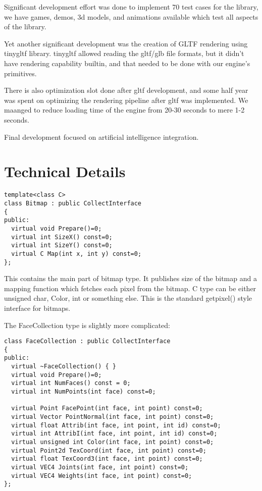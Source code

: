 \documentclass[11pt,twoside,a4paper]{article}
\begin{document}
Significant development effort was done to implement 70 test cases for
the library, we have games, demos, 3d models, and animations available
which test all aspects of the library.

Yet another significant development was the creation of GLTF rendering
using tinygltf library. tinygltf allowed reading the gltf/glb file
formats, but it didn't have rendering capability builtin, and that
needed to be done with our engine's primitives.

There is also optimization slot done after gltf development, and some
half year was spent on optimizing the rendering pipeline after gltf
was implemented. We maanged to reduce loading time of the engine from
20-30 seconds to mere 1-2 seconds.

Final development focused on artificial intelligence integration.

\section{Technical Details}

\begin{verbatim}
template<class C>
class Bitmap : public CollectInterface
{
public:
  virtual void Prepare()=0;
  virtual int SizeX() const=0;
  virtual int SizeY() const=0;
  virtual C Map(int x, int y) const=0;
};
\end{verbatim}

This contains the main part of bitmap type. It publishes size of the bitmap and a mapping function which fetches each pixel from the bitmap. C type can be either unsigned char, Color, int or something else. This is the standard getpixel() style interface for bitmaps.

The FaceCollection type is slightly more complicated:

\begin{verbatim}
class FaceCollection : public CollectInterface
{
public:
  virtual ~FaceCollection() { }
  virtual void Prepare()=0;
  virtual int NumFaces() const = 0;
  virtual int NumPoints(int face) const=0;
  
  virtual Point FacePoint(int face, int point) const=0;
  virtual Vector PointNormal(int face, int point) const=0;
  virtual float Attrib(int face, int point, int id) const=0;
  virtual int AttribI(int face, int point, int id) const=0;
  virtual unsigned int Color(int face, int point) const=0;
  virtual Point2d TexCoord(int face, int point) const=0;
  virtual float TexCoord3(int face, int point) const=0;
  virtual VEC4 Joints(int face, int point) const=0;
  virtual VEC4 Weights(int face, int point) const=0;
};
\end{verbatim}
\end{document}
